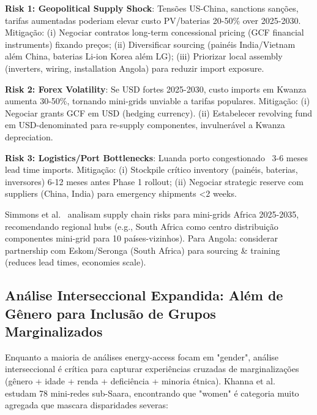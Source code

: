 \documentclass[12pt, a4paper]{article}
\begin{document}
\textbf{Risk 1: Geopolitical Supply Shock}: Tensões US-China, sanctions sanções, tarifas aumentadas poderiam elevar custo PV/baterias 20-50\% over 2025-2030. Mitigação: (i) Negociar contratos long-term concessional pricing (GCF financial instruments) fixando preços; (ii) Diversificar sourcing (painéis India/Vietnam além China, baterias Li-ion Korea além LG); (iii) Priorizar local assembly (inverters, wiring, installation Angola) para reduzir import exposure.

\textbf{Risk 2: Forex Volatility}: Se USD fortes 2025-2030, custo imports em Kwanza aumenta 30-50\%, tornando mini-grids unviable a tarifas populares. Mitigação: (i) Negociar grants GCF em USD (hedging currency). (ii) Estabelecer revolving fund em USD-denominated para re-supply componentes, invulnerável a Kwanza depreciation.

\textbf{Risk 3: Logistics/Port Bottlenecks}: Luanda porto congestionado ~3-6 meses lead time imports. Mitigação: (i) Stockpile crítico inventory (painéis, baterias, inversores) 6-12 meses antes Phase 1 rollout; (ii) Negociar strategic reserve com suppliers (China, India) para emergency shipments <2 weeks.

Simmons et al.~\citep{Simmons2025} analisam supply chain risks para mini-grids Africa 2025-2035, recomendando regional hubs (e.g., South Africa como centro distribuição componentes mini-grid para 10 países-vizinhos). Para Angola: considerar partnership com Eskom/Seronga (South Africa) para sourcing \& training (reduces lead times, economies scale).

\subsection{Análise Interseccional Expandida: Além de Gênero para Inclusão de Grupos Marginalizados}

Enquanto a maioria de análises energy-access focam em "gender", análise interseccional é crítica para capturar experiências cruzadas de marginalizações (gênero + idade + renda + deficiência + minoria étnica). Khanna et al.~\citep{Khanna2025} estudam 78 mini-redes sub-Saara, encontrando que "women" é categoria muito agregada que mascara disparidades severas:
\end{document}
